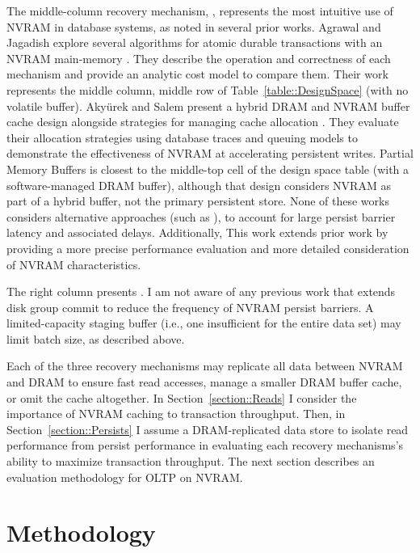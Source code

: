The middle-column recovery mechanism, \InPlace, represents the most intuitive use of NVRAM in database systems, as noted in several prior works.
Agrawal and Jagadish explore several algorithms for atomic durable transactions with an NVRAM main-memory \cite{AgrawalJagadish89}.
They describe the operation and correctness of each mechanism and provide an analytic cost model to compare them.
Their work represents the middle column, middle row of Table~\ref{table::DesignSpace} (\InPlace with no volatile buffer).
Aky\"{u}rek and Salem present a hybrid DRAM and NVRAM buffer cache design alongside strategies for managing cache allocation \cite{SalemAkyrek95}.
They evaluate their allocation strategies using database traces and queuing models to demonstrate the effectiveness of NVRAM at accelerating persistent writes.
Partial Memory Buffers is closest to the middle-top cell of the design space table (\InPlace with a software-managed DRAM buffer), although that design considers NVRAM as part of a hybrid buffer, not the primary persistent store.
None of these works considers alternative approaches (such as \GroupCommit), to account for large persist barrier latency and associated delays.
Additionally, This work extends prior work by providing a more precise performance evaluation and more detailed consideration of NVRAM characteristics.

The right column presents \GroupCommit.
I am not aware of any previous work that extends disk group commit to reduce the frequency of NVRAM persist barriers.
A limited-capacity staging buffer (i.e., one insufficient for the entire data set) may limit batch size, as described above.

Each of the three recovery mechanisms may replicate all data between NVRAM and DRAM to ensure fast read accesses, manage a smaller DRAM buffer cache, or omit the cache altogether.
In Section~\ref{section::Reads} I consider the importance of NVRAM caching to transaction throughput.
Then, in Section~\ref{section::Persists} I assume a DRAM-replicated data store to isolate read performance from persist performance in evaluating each recovery mechanisms's ability to maximize transaction throughput.
The next section describes an evaluation methodology for OLTP on NVRAM.

\section{Methodology}
\label{sec:OLTP_design:Methodology}

